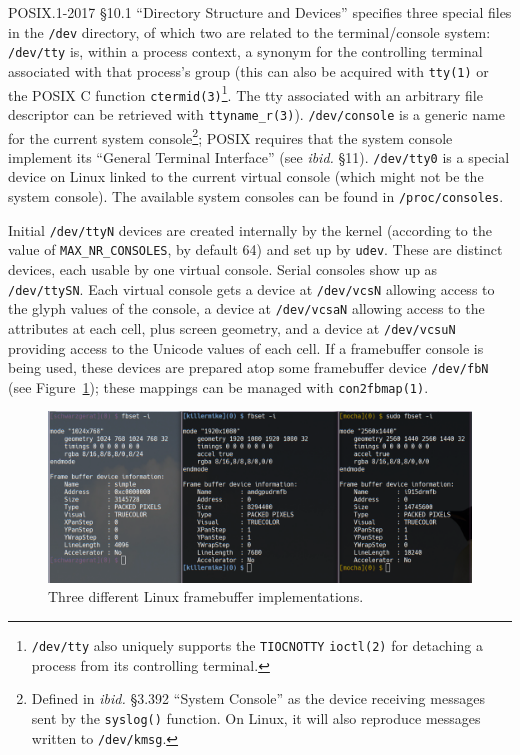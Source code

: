 POSIX.1-2017\cite{posix2017} §10.1 ``Directory Structure and Devices''
specifies three special files in the \texttt{/dev} directory, of which two are
related to the terminal/console system: \texttt{/dev/tty} is, within a process
context, a synonym for the controlling terminal associated with that process's
group (this can also be acquired with \texttt{tty(1)} or the POSIX C function
\texttt{ctermid(3)}\footnote{\texttt{/dev/tty} also uniquely supports the
\texttt{TIOCNOTTY} \texttt{ioctl(2)} for detaching a process from its
controlling terminal.}. The tty associated with an arbitrary file descriptor can
be retrieved with \texttt{ttyname\_r(3)}). \texttt{/dev/console} is a generic name for the current system console\footnote{Defined in \textit{ibid.} §3.392
``System Console'' as the device receiving messages sent by the \texttt{syslog()}
function. On Linux, it will also reproduce messages written to \texttt{/dev/kmsg}\cite{dmesg}.};
POSIX requires that the system console implement its ``General Terminal Interface'' (see
\textit{ibid.} §11). \texttt{/dev/tty0} is a special device on Linux linked to
the current virtual console (which might not be the system console). The
available system consoles can be found in \texttt{/proc/consoles}.

Initial \texttt{/dev/ttyN} devices are created internally by the kernel
(according to the value of \texttt{MAX\_NR\_CONSOLES}, by default 64) and set
up by \texttt{udev}. These are distinct devices, each usable by one virtual
console. Serial consoles show up as \texttt{/dev/ttySN}\cite{ttys4}. Each
virtual console gets a device at \texttt{/dev/vcsN} allowing access to the
glyph values of the console, a device at \texttt{/dev/vcsaN} allowing access to
the attributes at each cell, plus screen geometry, and a device at \texttt{/dev/vcsuN}
providing access to the Unicode values of each cell. If a framebuffer console
is being used, these devices are prepared atop some framebuffer device \texttt{/dev/fbN} (see
Figure~\ref{fig:framebuffers}); these mappings can be managed with \texttt{con2fbmap(1)}.

\begin{figure}[!htbp]
  \centering
  \includegraphics[width=.75\linewidth]{media/framebuffers.png}
  \caption{Three different Linux framebuffer implementations.}
  \label{fig:framebuffers}
\end{figure}

